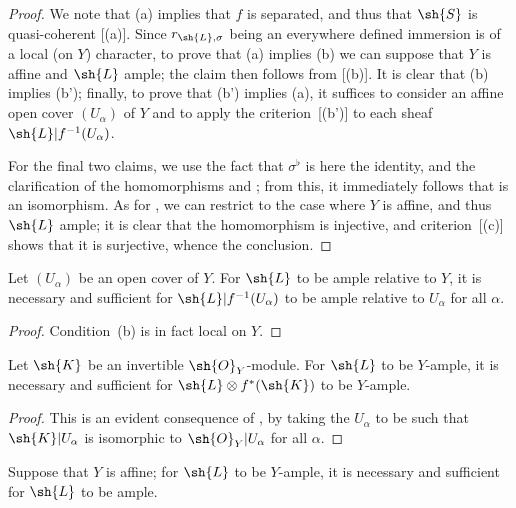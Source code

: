 \begin{proof}
We note that (a) implies that $f$ is separated, and thus that $\sh{S}$ is quasi-coherent [(a)].
Since $r_{\sh{L},\sigma}$ being an everywhere defined immersion is of a local (on $Y$) character, to prove that (a) implies (b) we can suppose that $Y$ is affine and $\sh{L}$ ample;
the claim then follows from [(b)].
It is clear that (b) implies (b');
finally, to prove that (b') implies (a), it suffices to consider an affine open cover $(U_\alpha)$ of $Y$ and to apply the criterion~[(b')] to each sheaf $\sh{L}|f^{-1}(U_\alpha)$.

For the final two claims, we use the fact that $\sigma^\flat$ is here the identity, and the clarification of the homomorphisms  and ;
from this, it immediately follows that  is an isomorphism.
As for , we can restrict to the case where $Y$ is affine, and thus $\sh{L}$ ample;
it is clear that the homomorphism  is injective, and criterion~[(c)] shows that it is surjective, whence the conclusion.
\end{proof}

\begin{corollary}[4.6.4]
\label{II.4.6.4}
Let $(U_\alpha)$ be an open cover of $Y$.
For $\sh{L}$ to be ample relative to $Y$, it is necessary and sufficient for $\sh{L}|f^{-1}(U_\alpha)$ to be ample relative to $U_\alpha$ for all $\alpha$.
\end{corollary}

\begin{proof}
Condition~(b) is in fact local on $Y$.
\end{proof}

\begin{corollary}[4.6.5]
\label{II.4.6.5}
Let $\sh{K}$ be an invertible $\sh{O}_Y$-module.
For $\sh{L}$ to be $Y$-ample, it is necessary and sufficient for $\sh{L}\otimes f^*(\sh{K})$ to be $Y$-ample.
\end{corollary}

\begin{proof}
This is an evident consequence of , by taking the $U_\alpha$ to be such that $\sh{K}|U_\alpha$ is isomorphic to $\sh{O}_Y|U_\alpha$ for all $\alpha$.
\end{proof}

\begin{corollary}[4.6.6]
\label{II.4.6.6}
Suppose that $Y$ is affine;
for $\sh{L}$ to be $Y$-ample, it is necessary and sufficient for $\sh{L}$ to be ample.
\end{corollary}

